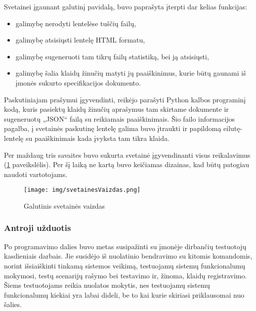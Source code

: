 \documentclass{VUMIFPSkursinis}
\begin{document}
Svetainei įgaunant galutinį pavidalą, buvo paprašyta įterpti dar kelias funkcijas:
\begin{itemize}
    \item galimybę nerodyti lentelėse tuščių failų,
    \item galimybę atsisiųsti lentelę HTML formatu,
    \item galimybę sugeneruoti tam tikrų failų statistiką, bei ją atsisiųsti,
    \item galimybę šalia klaidų žinučių matyti jų paaiškinimus, kurie būtų gaunami iš įmonės sukurto specifikacijos dokumento.
\end{itemize}

Paskutiniajam prašymui įgyvendinti, reikėjo parašyti Python kalbos programinį kodą, kuris pasiektų klaidų žinučių aprašymus tam skirtame dokumente ir sugeneruotų „JSON“ failą su reikiamais paaiškinimais. Šio failo informacijos pagalba, į svetainės paskutinę lentelę galima buvo įtraukti ir papildomą eilutę-lentelę su paaiškinimais kada įvyksta tam tikra klaida.

Per maždaug tris savaites buvo sukurta svetainė įgyvendinanti visus reikalavimus (\ref{img:svetaine} paveikslėlis). Per šį laiką ne kartą buvo keičiamas dizainas, kad būtų patogiau naudoti vartotojams. 


\begin{figure}[H]
    \centering
    \texttt{[image: img/svetainesVaizdas.png]}
    \caption{Galutinis svetainės vaizdas}
    \label{img:svetaine}
\end{figure}
\newpage
\subsubsection{Antroji užduotis}

Po programavimo dalies buvo metas susipažinti su įmonėje dirbančių testuotojų kasdieniais darbais. Jie susidėjo iš nuolatinio bendravimo su kitomis komandomis, norint išsiaiškinti tinkamą sistemos veikimą, testuojamų sistemų funkcionalumų mokymosi, testų scenarijų rašymo bei testavimo ir, žinoma, klaidų registravimo. Šiems testuotojams reikia nuolatos mokytis, nes testuojamų sistemų funkcionalumų kiekiai yra labai dideli, be to kai kurie skiriasi priklausomai nuo šalies. 
\end{document}
